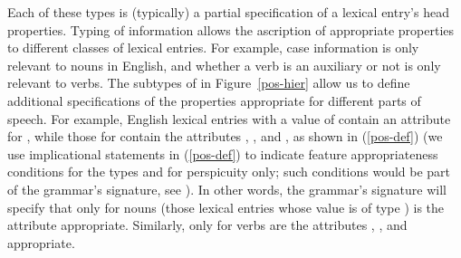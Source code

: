 \documentclass[output=paper
 	        ,biblatex
                ,babelshorthands
                ,newtxmath
                ,draftmode
                ,colorlinks, citecolor=brown
]{langscibook}
\begin{document}
Each of these types is (typically) a partial specification of a lexical entry's head properties.
Typing of  information allows the ascription of appropriate properties to different classes of lexical entries. For example, case information is only relevant to nouns in English, and whether a verb is an auxiliary or not is only relevant to verbs. 
The subtypes of  in Figure~\ref{pos-hier} allow us to define additional specifications of the properties appropriate for different parts of speech.
For example, English lexical entries with a  value of  contain an attribute for , while those for  contain the attributes , , and , as shown in (\ref{pos-def}) (we use implicational statements in (\ref{pos-def}) to indicate feature appropriateness conditions for the types  and  for perspicuity only; such conditions would be part of the grammar's signature, see \crossrefchaptert[\pageref{formal:page-signature}]{formal-background}). 
In other words, the grammar's signature will specify that only for nouns (those lexical entries whose  value is of type ) is the attribute  appropriate.
Similarly, only for verbs are the attributes , , and  appropriate.
\end{document}
